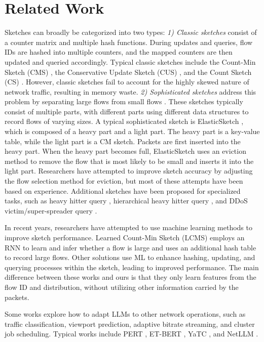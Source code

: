\section{Related Work}


%
Sketches can broadly be categorized into two types:
%
\textit{1) Classic sketches} consist of a counter matrix and multiple hash functions. During updates and queries, flow IDs are hashed into multiple counters, and the mapped counters are then updated and queried accordingly. Typical classic sketches include the Count-Min Sketch (CMS) \cite{cmsketch}, the Conservative Update Sketch (CUS) \cite{cusketch}, and the Count Sketch (CS) \cite{csketch}. However, classic sketches fail to account for the highly skewed nature of network traffic, resulting in memory waste.
%
\textit{2) Sophisticated sketches} address this problem by separating large flows from small flows \cite{elasticsketch, sketchlearn, nitrosketch, nze-sketch, bitsense}. These sketches typically consist of multiple parts, with different parts using different data structures to record flows of varying sizes. A typical sophisticated sketch is ElasticSketch \cite{elasticsketch}, which is composed of a heavy part and a light part. The heavy part is a key-value table, while the light part is a CM sketch. Packets are first inserted into the heavy part. When the heavy part becomes full, ElasticSketch uses an eviction method to remove the flow that is most likely to be small and inserts it into the light part. Researchers have attempted to improve sketch accuracy by adjusting the flow selection method for eviction, but most of these attempts have been based on experience.
%
Additional sketches have been proposed for specialized tasks, such as heavy hitter query \cite{css, mvsketch, precision}, hierarchical heavy hitter query \cite{rhhh, cocosketch}, and DDoS victim/super-spreader query \cite{opensketch, spreadsketch}.




%
In recent years, researchers have attempted to use machine learning methods to improve sketch performance. Learned Count-Min Sketch (LCMS) \cite{lcmsketch} employs an RNN to learn and infer whether a flow is large and uses an additional hash table to record large flows. Other solutions \cite{bertsimas2021frequency, mlsketch, metasketch} use ML to enhance hashing, updating, and querying processes within the sketch, leading to improved performance. The main difference between these works and ours is that they only learn features from the flow ID and distribution, without utilizing other information carried by the packets.




%
Some works explore how to adapt LLMs to other network operations, such as traffic classification, viewport prediction, adaptive bitrate streaming, and cluster job scheduling. Typical works include PERT \cite{pert}, ET-BERT \cite{et-bert}, YaTC \cite{yatc}, and NetLLM \cite{netllm}.

